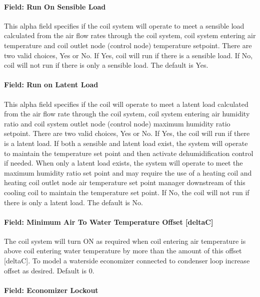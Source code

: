 \paragraph{Field: Run On Sensible Load}\label{field-run-on-sensible-load-01}

This alpha field specifies if the coil system will operate to meet a sensible load calculated from the air flow rates through the coil system, coil system entering air temperature and coil outlet node (control node) temperature setpoint. There are two valid choices, Yes or No. If Yes, coil will run if there is a sensible load. If No, coil will not run if there is only a sensible load. The default is Yes.


\paragraph{Field: Run on Latent Load}\label{field-run-on-latent-load-01}

This alpha field specifies if the coil will operate to meet a latent load calculated from the air flow rate through the coil system, coil system entering air humidity ratio and coil system outlet node (control node) maximum humidity ratio setpoint. There are two valid choices, Yes or No. If Yes, the coil will run if there is a latent load. If both a sensible and latent load exist, the system will operate to maintain the temperature set point and then activate dehumidification control if needed. When only a latent load exists, the system will operate to meet the maximum humidity ratio set point and may require the use of a heating coil and heating coil outlet node air temperature set point manager downstream of this cooling coil to maintain the temperature set point. If No, the coil will not run if there is only a latent load. The default is No.


\paragraph{Field: Minimum Air To Water Temperature Offset [deltaC]}\label{field-minimum-air-to-water-temperature-offset}

The coil system will turn ON as required when coil entering air temperature is above coil entering water temperature by more than the amount of this offset [deltaC]. To model a waterside economizer connected to condenser loop increase offset as desired. Default is 0.

\paragraph{Field: Economizer Lockout}\label{field-economizer-lockout-1007}

